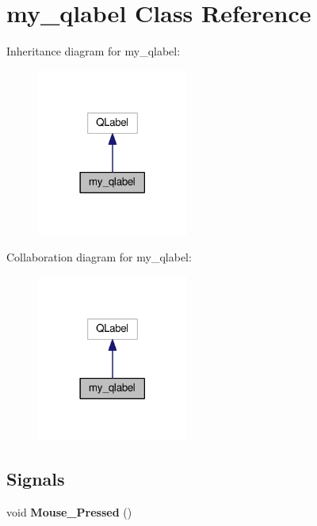 \hypertarget{classmy__qlabel}{}\section{my\+\_\+qlabel Class Reference}
\label{classmy__qlabel}


Inheritance diagram for my\+\_\+qlabel\+:
\nopagebreak
\begin{figure}[H]
\begin{center}
\leavevmode
\includegraphics[width=141pt]{classmy__qlabel__inherit__graph}
\end{center}
\end{figure}


Collaboration diagram for my\+\_\+qlabel\+:
\nopagebreak
\begin{figure}[H]
\begin{center}
\leavevmode
\includegraphics[width=141pt]{classmy__qlabel__coll__graph}
\end{center}
\end{figure}
\subsection*{Signals}
\begin{DoxyCompactItemize}
\item 
void {\bfseries Mouse\+\_\+\+Pressed} ()\hypertarget{classmy__qlabel_a1094bbff475125fc3e6c3d2d8af03fd5}{}\label{classmy__qlabel_a1094bbff475125fc3e6c3d2d8af03fd5}

\end{DoxyCompactItemize}
